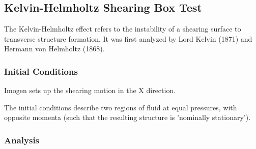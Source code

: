 
\subsection{Kelvin-Helmholtz Shearing Box Test}

The Kelvin-Helmholtz effect refers to the instability of a shearing surface to transverse structure formation.
It was first analyzed by Lord Kelvin (1871) and Hermann von Helmholtz (1868).

\subsubsection{Initial Conditions}

Imogen sets up the shearing motion in the X direction.

The initial conditions describe two regions of fluid at equal pressures, with opposite momenta
(such that the resulting structure is 'nominally stationary').

\subsubsection{Analysis}


